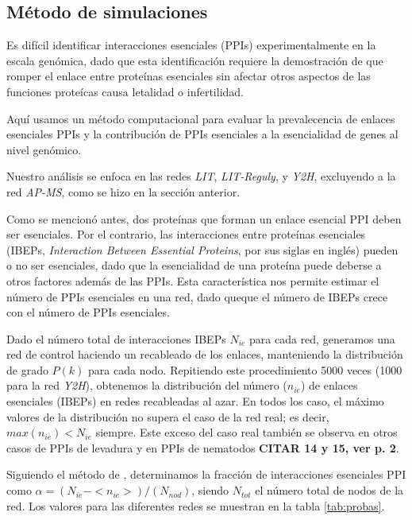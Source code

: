 
\subsection{M\'etodo de simulaciones}
\label{sec:simulacion}

Es dif\'icil identificar interacciones esenciales (PPIs) experimentalmente en la escala gen\'omica, dado que esta identificaci\'on requiere la demostraci\'on de que romper el enlace entre prote\'inas esenciales sin afectar otros aspectos de las funciones prote\'icas causa letalidad o infertilidad.

Aqu\'i usamos un m\'etodo computacional para evaluar la prevalecencia de enlaces esenciales PPIs y la contribuci\'on de PPIs esenciales a la esencialidad de genes al nivel gen\'omico.

Nuestro an\'alisis se enfoca en las redes {\it LIT}, {\it LIT-Reguly}, y {\it Y2H}, excluyendo a la red {\it AP-MS}, como se hizo en la secci\'on anterior.

Como se mencion\'o antes, dos prote\'inas que forman un enlace esencial PPI deben ser esenciales.
Por el contrario, las interacciones entre prote\'inas esenciales (IBEPs, {\it Interaction Between Essential Proteins}, por sus siglas en ingl\'es) pueden o no ser esenciales, dado que la esencialidad de una prote\'ina puede deberse a otros factores adem\'as de las PPIs.
Esta caracter\'istica nos permite estimar el n\'umero de PPIs esenciales en una red, dado queque el n\'umero de IBEPs crece con el n\'umero de PPIs esenciales.

Dado el n\'umero total de interacciones IBEPs $N_{ie}$ para cada red, generamos una red de control haciendo un recableado de los enlaces, manteniendo la distribuci\'on de grado $P(k)$ para cada nodo.
Repitiendo este procedimiento 5000 veces (1000 para la red {\it Y2H}), obtenemos la distribuci\'on del n\'umero ($n_{ie}$) de enlaces esenciales (IBEPs) en redes recableadas al azar.
En todos los caso, el m\'aximo valores de la distribuci\'on no supera el caso de la red real; es decir, $max(n_{ie}) < N_{ie}$ siempre.
Este exceso del caso real tambi\'en se observa en otros casos de PPIs de levadura y en PPIs de nematodos {\bf CITAR 14 y 15, ver p. 2}.

Siguiendo el m\'etodo de \cite{he2006}, determinamos la fracci\'on de interacciones esenciales PPI como $\alpha = (N_{ie} - <n_{ie}>)/(N_{nod})$, siendo $N_{tot}$ el n\'umero total de nodos de la red.
Los valores para las diferentes redes se muestran en la tabla \ref{tab:probas}.


